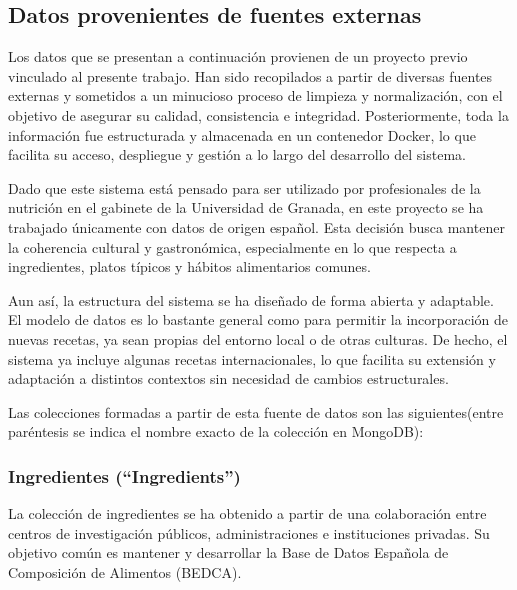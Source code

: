 \subsection{Datos provenientes de fuentes externas}
Los datos que se presentan a continuación provienen de un proyecto previo vinculado al presente trabajo. Han sido recopilados a partir de diversas fuentes externas y sometidos a un minucioso proceso de limpieza y normalización, con el objetivo de asegurar su calidad, consistencia e integridad. Posteriormente, toda la información fue estructurada y almacenada en un contenedor Docker, lo que facilita su acceso, despliegue y gestión a lo largo del desarrollo del sistema.

Dado que este sistema está pensado para ser utilizado por profesionales de la nutrición en el gabinete de la Universidad de Granada, en este proyecto se ha trabajado únicamente con datos de origen español. Esta decisión busca mantener la coherencia cultural y gastronómica, especialmente en lo que respecta a ingredientes, platos típicos y hábitos alimentarios comunes.

Aun así, la estructura del sistema se ha diseñado de forma abierta y adaptable. El modelo de datos es lo bastante general como para permitir la incorporación de nuevas recetas, ya sean propias del entorno local o de otras culturas. De hecho, el sistema ya incluye algunas recetas internacionales, lo que facilita su extensión y adaptación a distintos contextos sin necesidad de cambios estructurales.

Las colecciones formadas a partir de esta fuente de datos son las siguientes(entre paréntesis se indica el nombre exacto de la colección en MongoDB):

\subsubsection*{Ingredientes (``Ingredients'')}
La colección de ingredientes se ha obtenido a partir de una colaboración entre centros de investigación públicos, administraciones e instituciones privadas. Su objetivo común es mantener y desarrollar la Base de Datos Española de Composición de Alimentos (BEDCA).

